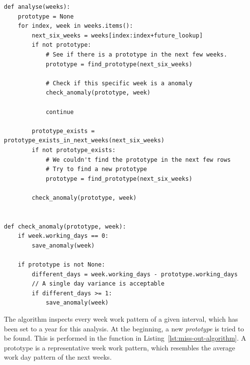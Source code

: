 \begin{verbatim}
def analyse(weeks):
    prototype = None
    for index, week in weeks.items():
        next_six_weeks = weeks[index:index+future_lookup]
        if not prototype:
            # See if there is a prototype in the next few weeks.
            prototype = find_prototype(next_six_weeks)

            # Check if this specific week is a anomaly
            check_anomaly(prototype, week)

            continue

        prototype_exists = prototype_exists_in_next_weeks(next_six_weeks)
        if not prototype_exists:
            # We couldn't find the prototype in the next few rows
            # Try to find a new prototype
            prototype = find_prototype(next_six_weeks)

        check_anomaly(prototype, week)


def check_anomaly(prototype, week):
    if week.working_days == 0:
        save_anomaly(week)

    if prototype is not None:
        different_days = week.working_days - prototype.working_days
        // A single day variance is acceptable
        if different_days >= 1:
            save_anomaly(week)

\end{verbatim}
\begingroup
{}\label{lst:miss-out-algorithm}
\endgroup

The algorithm inspects every week work pattern of a given interval, which has been set to a year for this analysis.
At the beginning, a new \emph{prototype} is tried to be found.
This is performed in the function  in Listing~\ref{lst:miss-out-algorithm}.
A prototype is a representative week work pattern, which resembles the average work day pattern of the next weeks.


